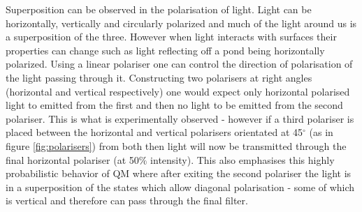 Superposition can be observed in the polarisation of light. 
Light can be horizontally, vertically and circularly polarized and much of the light around us is a superposition of the three.
However when light interacts with surfaces their properties can change such as light reflecting off a pond being horizontally polarized. 
Using a linear polariser one can control the direction of polarisation of the light passing through it.
Constructing two polarisers at right angles (horizontal and vertical respectively) one would expect only horizontal polarised light to emitted from the first and then no light to be emitted from the second polariser. 
This is what is experimentally observed - however if a third polariser is placed between the horizontal and vertical polarisers orientated at 45$^\circ$ (as in figure \ref{fig:polarisers}) from both then light will now be transmitted through the final horizontal polariser (at 50$\%$ intensity). \cite{noauthor_whatCal_nodate}
This also emphasises this highly probabilistic behavior of QM where after exiting the second polariser the light is in a superposition of the states which allow diagonal polarisation - some of which is vertical and therefore can pass through the final filter.
